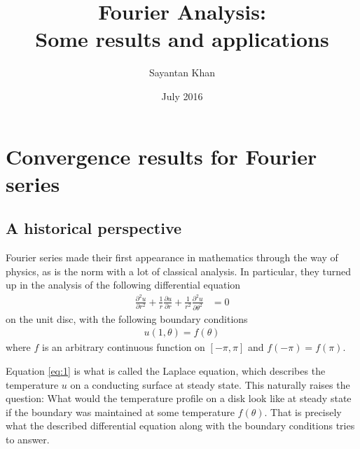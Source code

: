 \documentclass[12pt, titlepage]{article}
\title{Fourier Analysis: \\ Some results and applications}
\author{Sayantan Khan}
\date{July 2016}
\theoremstyle{definition}
\begin{document}
\maketitle

\tableofcontents

\newpage

\section{Convergence results for Fourier series}

\subsection{A historical perspective}
Fourier series made their first appearance in mathematics through the way of physics, as is the norm with a lot of classical analysis. In particular, they turned up in the analysis of the following differential equation
\begin{align}
    \frac{\partial^2 u}{\partial r^2} + \frac{1}{r} \frac{\partial u}{\partial r} + \frac{1}{r^2} \frac{\partial^2 u}{\partial \theta^2} &= 0 \label{eq:1}
\end{align}
on the unit disc, with the following boundary conditions
\begin{align*}
    u(1, \theta) = f(\theta)
\end{align*}
where $f$ is an arbitrary continuous function on $[-\pi, \pi]$ and $f(-\pi) = f(\pi)$.

Equation \ref{eq:1} is what is called the Laplace equation, which describes the temperature $u$ on a conducting surface at steady state. This naturally raises the question: What would the temperature profile on a disk look like at steady state if the boundary was maintained at some temperature $f(\theta)$. That is precisely what the described differential equation along with the boundary conditions tries to answer.
\end{document}
